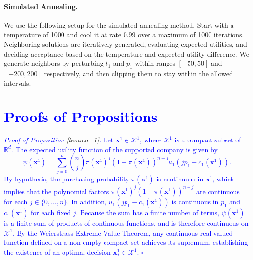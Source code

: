 \documentclass[a4paper,fleqn, 11pt]{cas-sc}
\newenvironment{proof}[1][Proof]{\noindent\textit{#1.} }{\hfill$\square$\par\medskip}
\begin{document}
\paragraph{Simulated Annealing.} We use the following setup for the simulated annealing method. 
Start with a temperature of 1000 and cool it at rate 0.99 over a maximum of 1000 iterations. Neighboring solutions are iteratively generated, evaluating expected utilities, and deciding acceptance based on the temperature and expected utility difference. We generate neighbors by perturbing \( t_1 \) and \( p_1 \) within ranges \([-50, 50]\) and \([-200, 200]\) respectively, and then clipping them to stay within the allowed intervals. 

\section{\textcolor{blue}{Proofs of Propositions}}\label{sec:proofs}

\textcolor{blue}{\begin{proof}[Proof of Proposition \ref{lemma_1}]
Let $\bm{x}^1 \in \mathcal{X}^1$, where $\mathcal{X}^1$ is a compact subset of $\mathbb{R}^d$. The expected utility function of the supported company is given by
\begin{equation*}
    \psi(\bm{x}^1) = \sum_{j=0}^n \binom{n}{j} \pi(\bm{x}^1)^j (1 - \pi(\bm{x}^1))^{n-j} u_1(j p_1 - c_1(\bm{x}^1)).
\end{equation*}
By hypothesis, the purchasing probability $\pi(\bm{x}^1)$ is continuous in $\bm{x}^1$, which implies that the polynomial factors $\pi(\bm{x}^1)^j (1 - \pi(\bm{x}^1))^{n-j}$ are continuous for each $j \in \{0, \ldots, n\}$. In addition, $u_1(j p_1 - c_1(\bm{x}^1))$ is continuous in $p_1$ and $c_1(\bm{x}^1)$ for each fixed $j$. Because the sum has a finite number of terms, $\psi(\bm{x}^1)$ is a finite sum of products of continuous functions, and is therefore continuous on $\mathcal{X}^1$. By the Weierstrass Extreme Value Theorem, any continuous real-valued function defined on a non-empty compact set achieves its supremum, establishing the existence of an optimal decision $\bm{x}^1_* \in \mathcal{X}^1$.
\end{proof}}
\end{document}
